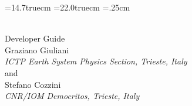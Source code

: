 \hsize=14.7truecm
\vsize=22.0truecm
\hoffset=.25cm
\voffset=7cm

\begin{center}
{\Huge \PR } \\
{\Large Developer Guide } \\
\vspace{2cm}
{\large Graziano Giuliani  } \\
{\em  ICTP Earth System Physics Section, Trieste, Italy} \\
{ and } \\
{\large Stefano Cozzini } \\
{\em CNR/IOM  Democritos, Trieste, Italy} \\
\end{center}

\date{}
